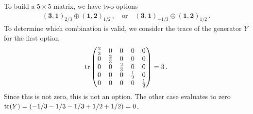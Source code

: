 To build a $5\times 5$ matrix, we have two options
\begin{align}
    (\mathbf{3},\mathbf{1})_{2/3} \oplus (\mathbf{1},\mathbf{2})_{1/2} \,, \quad \text{or} \quad (\mathbf{3},\mathbf{1})_{-1/3} \oplus (\mathbf{1},\mathbf{2})_{1/2} \,. \label{eq:irreps5}
\end{align}
To determine which combination is valid, we consider the trace of the generator $Y$ for the first option
\begin{align}
    \operatorname{tr}\begin{pmatrix}
        \frac{2}{3}&0&0&0&0\\
        0&\frac{2}{3}&0&0&0\\
        0&0&\frac{2}{3}&0&0\\
        0&0&0&\frac{1}{2}&0\\
        0&0&0&0&\frac{1}{2}\\
    \end{pmatrix}=3\,.
\end{align}
Since this is not zero, this is not an option. The other case evaluates to zero $\operatorname{tr}(Y)=(-1/3-1/3-1/3+1/2+1/2)=0$. 


